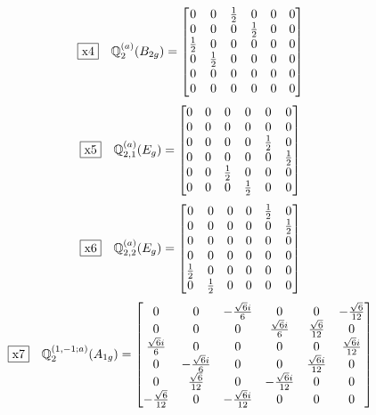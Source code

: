 \documentclass[fleqn,10pt,landscape]{jsarticle}
\begin{document}
\begin{dmath*}
\fbox{x4}\quad \mathbb{Q}_{2}^{(a)}(B_{2g})=\begin{bmatrix} 0 & 0 & \frac{1}{2} & 0 & 0 & 0 \\ 0 & 0 & 0 & \frac{1}{2} & 0 & 0 \\ \frac{1}{2} & 0 & 0 & 0 & 0 & 0 \\ 0 & \frac{1}{2} & 0 & 0 & 0 & 0 \\ 0 & 0 & 0 & 0 & 0 & 0 \\ 0 & 0 & 0 & 0 & 0 & 0 \end{bmatrix}
\end{dmath*}
\begin{dmath*}
\fbox{x5}\quad \mathbb{Q}_{2,1}^{(a)}(E_{g})=\begin{bmatrix} 0 & 0 & 0 & 0 & 0 & 0 \\ 0 & 0 & 0 & 0 & 0 & 0 \\ 0 & 0 & 0 & 0 & \frac{1}{2} & 0 \\ 0 & 0 & 0 & 0 & 0 & \frac{1}{2} \\ 0 & 0 & \frac{1}{2} & 0 & 0 & 0 \\ 0 & 0 & 0 & \frac{1}{2} & 0 & 0 \end{bmatrix}
\end{dmath*}
\begin{dmath*}
\fbox{x6}\quad \mathbb{Q}_{2,2}^{(a)}(E_{g})=\begin{bmatrix} 0 & 0 & 0 & 0 & \frac{1}{2} & 0 \\ 0 & 0 & 0 & 0 & 0 & \frac{1}{2} \\ 0 & 0 & 0 & 0 & 0 & 0 \\ 0 & 0 & 0 & 0 & 0 & 0 \\ \frac{1}{2} & 0 & 0 & 0 & 0 & 0 \\ 0 & \frac{1}{2} & 0 & 0 & 0 & 0 \end{bmatrix}
\end{dmath*}
\begin{dmath*}
\fbox{x7}\quad \mathbb{Q}_{2}^{(1,-1;a)}(A_{1g})=\begin{bmatrix} 0 & 0 & - \frac{\sqrt{6} i}{6} & 0 & 0 & - \frac{\sqrt{6}}{12} \\ 0 & 0 & 0 & \frac{\sqrt{6} i}{6} & \frac{\sqrt{6}}{12} & 0 \\ \frac{\sqrt{6} i}{6} & 0 & 0 & 0 & 0 & \frac{\sqrt{6} i}{12} \\ 0 & - \frac{\sqrt{6} i}{6} & 0 & 0 & \frac{\sqrt{6} i}{12} & 0 \\ 0 & \frac{\sqrt{6}}{12} & 0 & - \frac{\sqrt{6} i}{12} & 0 & 0 \\ - \frac{\sqrt{6}}{12} & 0 & - \frac{\sqrt{6} i}{12} & 0 & 0 & 0 \end{bmatrix}
\end{dmath*}
\end{document}
